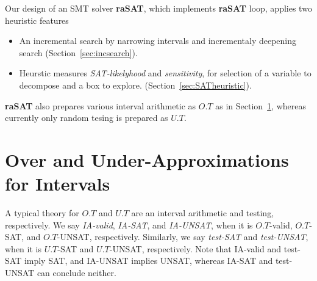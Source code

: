 \documentclass[runningheads,a4paper,oribibl]{llncs}
\newcommand{\Real}{{\mathbb R}}
\newcommand{\suppress}[1]{} %
\begin{document}
Our design of an SMT solver {\bf raSAT}, which implements {\bf raSAT} loop, 
applies two heuristic features 
\begin{itemize}
\item An incremental search by narrowing intervals and incrementaly deepening search
(Section~\ref{sec:incsearch}). 
\item 
Heurstic measures {\em SAT-likelyhood} and {\em sensitivity}, 
for selection of a variable to decompose and a box to explore. 
(Section~\ref{sec:SATheuristic}). 
\end{itemize} 

{\bf raSAT} also prepares various interval arithmetic as $O.T$ as in Section~\ref{sec:approximation}, 
whereas currently only random tesing is prepared as $U.T$. 



\section{Over and Under-Approximations for Intervals} \label{sec:approximation}

A typical theory for $O.T$ and $U.T$ are an interval arithmetic and testing, respectively. 
We say {\em IA-valid}, {\em IA-SAT}, and {\em IA-UNSAT}, when it is $O.T$-valid, $O.T$-SAT, and 
$O.T$-UNSAT, respectively. 
Similarly, we say {\em test-SAT} and {\em test-UNSAT}, when it is $U.T$-SAT and $U.T$-UNSAT, respectively. 
Note that IA-valid and test-SAT imply SAT, and IA-UNSAT implies UNSAT, 
whereas IA-SAT and test-UNSAT can conclude neither. 


\suppress{
\begin{definition}\label{def:testing}
Let $M = \bigwedge \limits_{i=1}^m x_i \in (a_i,b_i)$ and 
${\mathcal P} = \bigwedge \limits_{i=1}^m f_i(x_1,\cdots,x_n) > 0$. 
%
Let a choice function $\theta : (\Real \times \Real)^n \rightarrow \Real^n$ 
such that $\theta(M) \in (a_1,b_1) \times \cdots \times (a_n,b_n)$. 
Testing is a finite set $\Theta$ of choice functions. Then, we say 
\begin{itemize}
\item ${\mathcal P}$ is \emph{Test-SAT} under $M$ if $\theta(M)$ holds ${\mathcal P}$ 
for some $\theta \in \Theta$, and 
\item ${\mathcal P}$ is \emph{Test-UNSAT} under $M$ if $\theta(M)$ never holds ${\mathcal P}$ 
for each $\theta \in \Theta$. 
\end{itemize} 
\end{definition}
}
\end{document}
